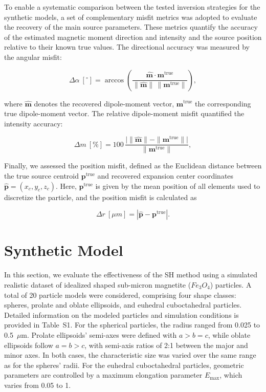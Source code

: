 To enable a systematic comparison between the tested inversion strategies for the synthetic models, a set of complementary misfit metrics was adopted to evaluate the recovery of the main source parameters. These metrics quantify the accuracy of the estimated magnetic moment direction and intensity and the source position relative to their known true values. The directional accuracy was measured by the angular misfit: 

\begin{equation}
\label{eq:ang_misfit}
\Delta\alpha~[^{\circ}] = \arccos\!\left(
\frac{\hat{\mathbf{m}}\cdot \mathbf{m}^{\mathrm{true}}}
{\|\hat{\mathbf{m}}\|\,\|\mathbf{m}^{\mathrm{true}}\|}
\right),
\end{equation}

\noindent where $\hat{\mathbf{m}}$ denotes the recovered dipole-moment vector, $\mathbf{m}^{\mathrm{true}}$ the corresponding true dipole-moment vector. The relative dipole-moment misfit quantified the intensity accuracy: 

\begin{equation}
\label{eq:m_misfit}
\Delta m~[\%] =
100\,\frac{\big|\|\hat{\mathbf{m}}\| - \|\mathbf{m}^{\mathrm{true}}\|\big|}
{\|\mathbf{m}^{\mathrm{true}}\|},
\end{equation}

\noindent Finally, we assessed the position misfit, defined as the Euclidean distance between the true source centroid $\mathbf{p}^{\mathrm{true}}$ and recovered expansion center coordinates $\hat{\mathbf{p}} = (x_c, y_c, z_c)$. Here, $\mathbf{p}^{\mathrm{true}}$ is given by the mean position of all elements used to discretize the particle, and the position misfit is calculated as

\begin{equation}
\label{eq:pos_misfit}
\Delta r~[\mu m] = \left|\hat{\mathbf{p}} - \mathbf{p}^{\mathrm{true}}\right|.
\end{equation}





\section{Synthetic Model}\label{numerical_simulation}

In this section, we evaluate the effectiveness of the SH method using a simulated realistic dataset of idealized shaped sub-micron magnetite ($Fe_3O_4$) particles. A total of 20 particle models were considered, comprising four shape classes: spheres, prolate and oblate ellipsoids, and euhedral cuboctahedral particles. Detailed information on the modeled particles and simulation conditions is provided in Table~S1. For the spherical particles, the radius ranged from 0.025 to 0.5~$\mu$m. Prolate ellipsoids' semi-axes were defined with $a > b = c$, while oblate ellipsoids follow $a = b > c$, with semi-axis ratios of 2:1 between the major and minor axes. In both cases, the characteristic size was varied over the same range as for the spheres' radii. For the euhedral cuboctahedral particles, geometric parameters are controlled by a maximum elongation parameter $E_{\mathrm{max}}$, which varies from 0.05 to 1.

